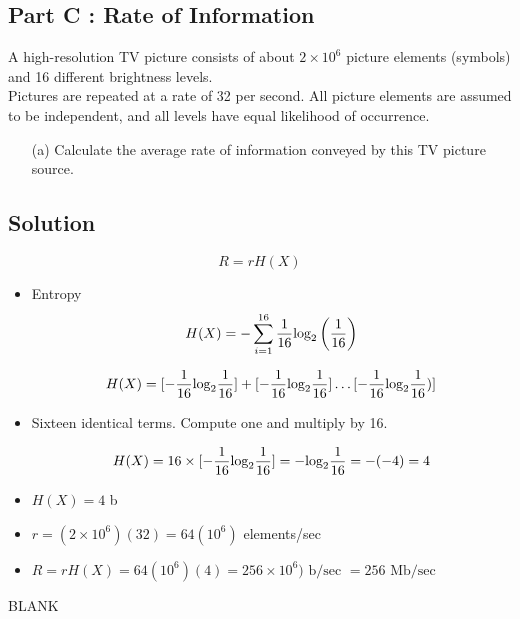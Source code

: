 \documentclass[a4paper,12pt]{article}
\begin{document}
\Large 
\subsection*{Part C : Rate of Information}
A high-resolution TV picture consists of about $2 \times 10^6$ picture elements (symbols) and 16
different brightness levels.\\
\newline
Pictures are repeated at a rate of 32 per second. All picture elements
are assumed to be independent, and all levels have equal likelihood of occurrence. 
\begin{itemize}
\item[(a)]Calculate the
average rate of information conveyed by this TV picture source.
\end{itemize}


\subsection*{Solution}
\[R = rH(X)\]
\begin{itemize}
\item Entropy \[H(X) = - \sum \limits^{16}_{i=1} {1\over 16} \mbox{log}_2 \left( {1\over 16} \right)\] \bigskip

\[H(X) = [ -{1\over 16} \mbox{log}_2{1\over 16} ] + [- {1\over 16} \mbox{log}_2{1\over 16} ] \ldots [ -{1\over 16} \mbox{log}_2{1\over 16}) ] \] \bigskip
\item Sixteen identical terms. Compute one and multiply by 16.

\[ H(X) = 16 \times [ -{1\over 16} \mbox{log}_2{1\over 16} ]  = -\mbox{log}_2{1\over 16} = -(-4) = 4\] \bigskip
\item $H(X)= 4$ b
\item $r =  (2 \times 10^6)(32) = 64(10^6)$ elements/sec \bigskip

\item $R = rH(X) = 64(10^6)(4) = 256 \times 10^6) \mbox{ b/sec } = 256 \mbox{ Mb/sec }$ \bigskip
\end{itemize}

\newpage 

BLANK
\end{document}
